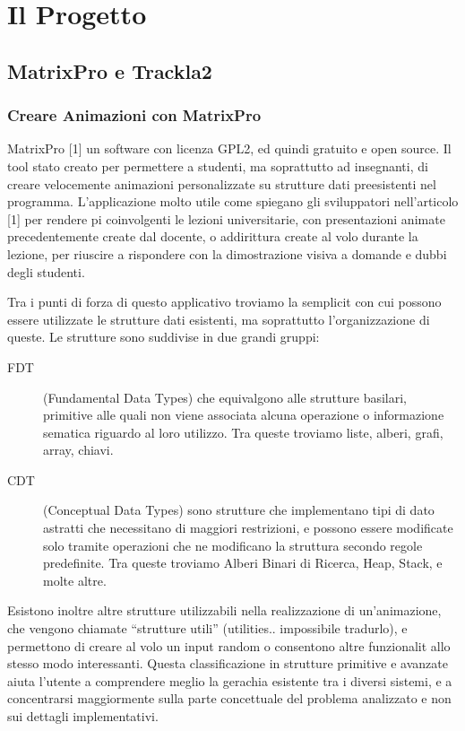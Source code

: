 
\chapter{Il Progetto}


\section{\label{sec:MatrixPro-e-Trackla2}MatrixPro e Trackla2}


\subsection{Creare Animazioni con MatrixPro}

MatrixPro {[}1{]} un software con licenza GPL2, ed quindi gratuito
e open source. Il tool  stato creato per permettere a studenti, ma
soprattutto ad insegnanti, di creare velocemente animazioni personalizzate
su strutture dati preesistenti nel programma. L'applicazione molto
utile come spiegano gli sviluppatori nell'articolo {[}1{]} per rendere
pi coinvolgenti le lezioni universitarie, con presentazioni animate
precedentemente create dal docente, o addirittura create al volo durante
la lezione, per riuscire a rispondere con la dimostrazione visiva
a domande e dubbi degli studenti.

Tra i punti di forza di questo applicativo troviamo la semplicit
con cui possono essere utilizzate le strutture dati esistenti, ma
soprattutto l'organizzazione di queste. Le strutture sono suddivise
in due grandi gruppi: 
\begin{description}
\item [{{FDT}}] (Fundamental Data Types) che equivalgono alle strutture
basilari, primitive alle quali non viene associata alcuna operazione
o informazione sematica riguardo al loro utilizzo. Tra queste troviamo
liste, alberi, grafi, array, chiavi. 
\item [{{CDT}}] (Conceptual Data Types) sono strutture che implementano
tipi di dato astratti che necessitano di maggiori restrizioni, e possono
essere modificate solo tramite operazioni che ne modificano la struttura
secondo regole predefinite. Tra queste troviamo Alberi Binari di Ricerca,
Heap, Stack, e molte altre. 
\end{description}
Esistono inoltre altre strutture utilizzabili nella realizzazione
di un'animazione, che vengono chiamate {}``strutture utili'' (utilities..
impossibile tradurlo), e permettono di creare al volo un input random
o consentono altre funzionalit allo stesso modo interessanti. Questa
classificazione in strutture primitive e avanzate aiuta l'utente a
comprendere meglio la gerachia esistente tra i diversi sistemi, e
a concentrarsi maggiormente sulla parte concettuale del problema analizzato
e non sui dettagli implementativi.

